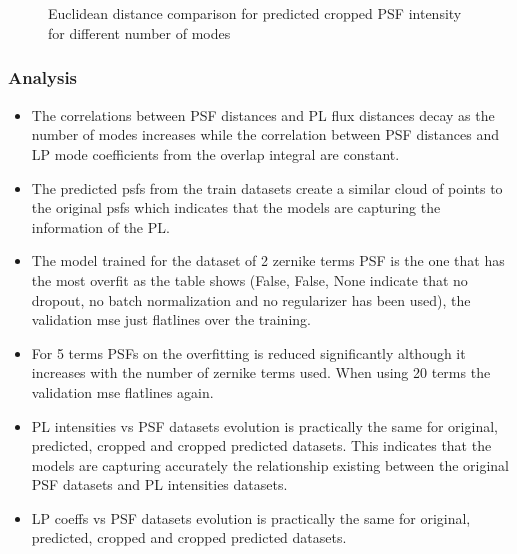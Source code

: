 		
		\begin{figure*}[ht!]
			\centering
			\\
			\\
			\\
			\\
				
			\caption{Euclidean distance comparison for predicted cropped PSF intensity for different number of modes}
		\end{figure*}
		\FloatBarrier
		
	\subsubsection{Analysis}
		\begin{itemize}
			\item The correlations between PSF distances and PL flux distances decay as the number of modes increases while the correlation between PSF distances and LP mode coefficients from the overlap integral are constant.
			\item The predicted psfs from the train datasets create a similar cloud of points to the original psfs which indicates that the models are capturing the information of the PL.
			\item The model trained for the dataset of 2 zernike terms PSF is the one that has the most overfit as the table shows (False, False, None indicate that no dropout, no batch normalization and no regularizer has been used), the validation mse just flatlines over the training.
			
			\item For 5 terms PSFs on the overfitting is reduced significantly although it increases with the number of zernike terms used. When using 20 terms the validation mse flatlines again.
			
			\item PL intensities vs PSF datasets evolution is practically the same for original, predicted, cropped and cropped predicted datasets. This indicates that the models are capturing accurately the relationship existing between the original PSF datasets and PL intensities datasets.
			
			\item LP coeffs vs PSF datasets evolution is practically the same for original, predicted, cropped and cropped predicted datasets.
		\end{itemize}
    
    
     
		\FloatBarrier